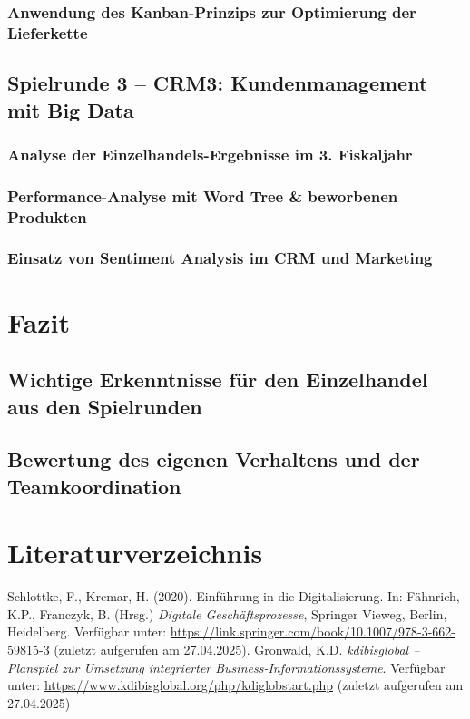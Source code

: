 \documentclass[a4paper,12pt]{article}
\begin{document}
\subsubsection{Anwendung des Kanban-Prinzips zur Optimierung der Lieferkette}

\subsection{Spielrunde 3 – CRM3: Kundenmanagement mit Big Data}
\subsubsection{Analyse der Einzelhandels-Ergebnisse im 3. Fiskaljahr}
\subsubsection{ Performance-Analyse mit Word Tree \& beworbenen Produkten}
\subsubsection{Einsatz von Sentiment Analysis im CRM und Marketing}

\section{Fazit}
\subsection{Wichtige Erkenntnisse für den Einzelhandel aus den Spielrunden}
\subsection{Bewertung des eigenen Verhaltens und der Teamkoordination}

\newpage
{}
\section*{Literaturverzeichnis}
\begin{thebibliography}{99}
     Schlottke, F., Krcmar, H. (2020). Einführung in die Digitalisierung. In: Fähnrich, K.P., Franczyk, B. (Hrsg.) \textit{Digitale Geschäftsprozesse}, Springer Vieweg, Berlin, Heidelberg. Verfügbar unter: \url{https://link.springer.com/book/10.1007/978-3-662-59815-3} (zuletzt aufgerufen am 27.04.2025).
     Gronwald, K.D. \textit{kdibisglobal – Planspiel zur Umsetzung integrierter Business-Informationssysteme}. Verfügbar unter: \url{https://www.kdibisglobal.org/php/kdiglobstart.php} (zuletzt aufgerufen am 27.04.2025)
\end{thebibliography}
\end{document}
